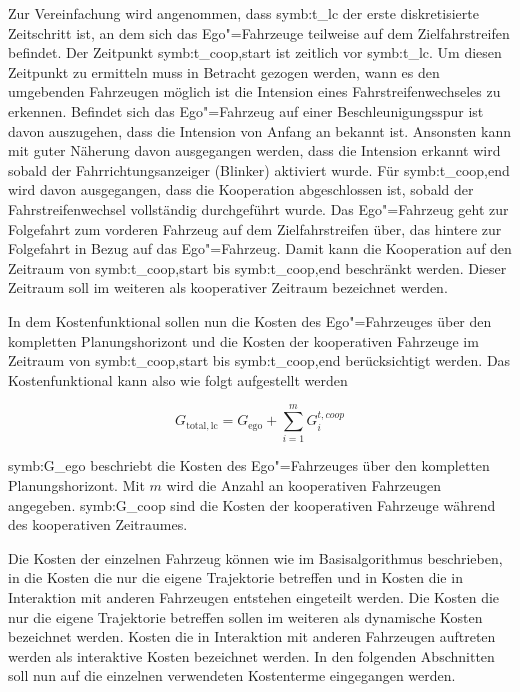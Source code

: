 Zur Vereinfachung wird angenommen, dass \gls{symb:t_lc} der erste diskretisierte Zeitschritt ist, an dem sich das Ego"=Fahrzeuge teilweise auf dem Zielfahrstreifen befindet.
Der Zeitpunkt \gls{symb:t_coop,start} ist zeitlich vor \gls{symb:t_lc}.
Um diesen Zeitpunkt zu ermitteln muss in Betracht gezogen werden, wann es den umgebenden Fahrzeugen m\"oglich ist die Intension eines Fahrstreifenwechseles zu erkennen.
Befindet sich das Ego"=Fahrzeug auf einer Beschleunigungsspur ist davon auszugehen, dass die Intension von Anfang an bekannt ist.
Ansonsten kann mit guter N\"aherung davon ausgegangen werden, dass die Intension erkannt wird sobald der Fahrrichtungsanzeiger (Blinker) aktiviert wurde.
F\"ur \gls{symb:t_coop,end} wird davon ausgegangen, dass die Kooperation abgeschlossen ist, sobald der Fahrstreifenwechsel vollst\"andig durchgef\"uhrt wurde.
Das Ego"=Fahrzeug geht zur Folgefahrt zum vorderen Fahrzeug auf dem Zielfahrstreifen \"uber, das hintere zur Folgefahrt in Bezug auf das Ego"=Fahrzeug.
Damit kann die Kooperation auf den Zeitraum von \gls{symb:t_coop,start} bis  \gls{symb:t_coop,end} beschr\"ankt werden.
Dieser Zeitraum soll im weiteren als kooperativer Zeitraum bezeichnet werden.

In dem Kostenfunktional sollen nun die Kosten des Ego"=Fahrzeuges \"uber den kompletten Planungshorizont und die Kosten der kooperativen Fahrzeuge im Zeitraum von \gls{symb:t_coop,start} bis \gls{symb:t_coop,end} ber\"ucksichtigt werden.
Das Kostenfunktional kann also wie folgt aufgestellt werden

\begin{equation}
	G_\mathrm{total,lc} = G_\mathrm{ego} + \sum_{i = 1}^m G_i^{t,coop}
\end{equation}

\gls{symb:G_ego} beschriebt die Kosten des Ego"=Fahrzeuges \"uber den kompletten Planungshorizont. 
Mit \( m \) wird die Anzahl an kooperativen Fahrzeugen angegeben.
\gls{symb:G_coop} sind die Kosten der kooperativen Fahrzeuge w\"ahrend des kooperativen Zeitraumes.

Die Kosten der einzelnen Fahrzeug k\"onnen wie im Basisalgorithmus beschrieben, in die Kosten die nur die eigene Trajektorie betreffen und in Kosten die in Interaktion mit anderen Fahrzeugen entstehen eingeteilt werden.
Die Kosten die nur die eigene Trajektorie betreffen sollen im weiteren als dynamische Kosten bezeichnet werden.
Kosten die in Interaktion mit anderen Fahrzeugen auftreten werden als interaktive Kosten bezeichnet werden.
In den folgenden Abschnitten soll nun auf die einzelnen verwendeten Kostenterme eingegangen werden.

